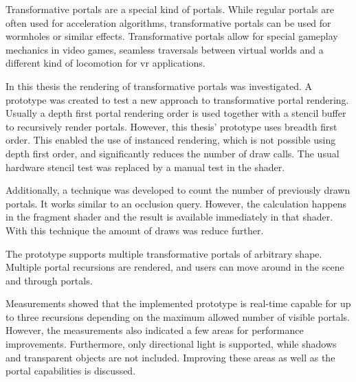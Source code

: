 
Transformative portals are a special kind of portals. While regular portals are often used for acceleration algorithms, transformative portals can be used for wormholes or similar effects. Transformative portals allow for special gameplay mechanics in video games, seamless traversals between virtual worlds and a different kind of locomotion for \gls{vr} applications.

In this thesis the rendering of transformative portals was investigated. A prototype was created to test a new approach to transformative portal rendering. Usually a depth first portal rendering order is used together with a stencil buffer to recursively render portals. However, this thesis' prototype uses breadth first order. This enabled the use of instanced rendering, which is not possible using depth first order, and significantly reduces the number of draw calls. The usual hardware stencil test was replaced by a manual test in the shader.

Additionally, a technique was developed to count the number of previously drawn portals. It works similar to an occlusion query. However, the calculation happens in the fragment shader and the result is available immediately in that shader. With this technique the amount of draws was reduce further.

The prototype supports multiple transformative portals of arbitrary shape. Multiple portal recursions are rendered, and users can move around in the scene and through portals.

Measurements showed that the implemented prototype is real-time capable for up to three recursions depending on the maximum allowed number of visible portals. However, the measurements also indicated a few areas for performance improvements. Furthermore, only directional light is supported, while shadows and transparent objects are not included. Improving these areas as well as the portal capabilities is discussed.
